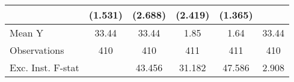 {\begin{tabular}{l*{5}{c}}
            &     (1.531)         &     (2.688)         &     (2.419)         &     (1.365)         &                     \\
\midrule
Mean Y      &       33.44         &       33.44         &        1.85         &        1.64         &       33.44         \\
Observations&         410         &         410         &         411         &         411         &         410         \\
Exc. Inst. F-stat&                     &      43.456         &      31.182         &      47.586         &       2.908         \\
\bottomrule
\end{tabular}
}
